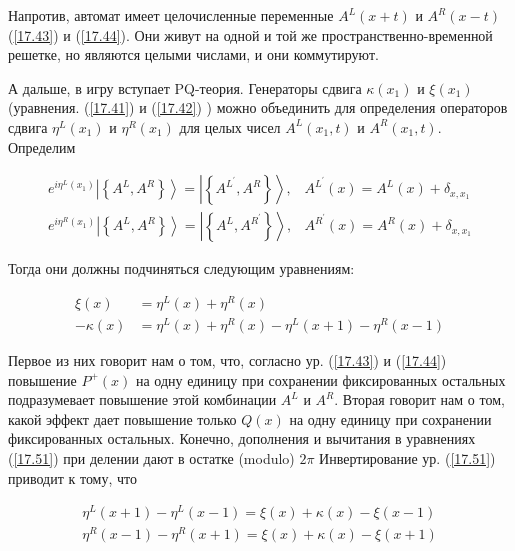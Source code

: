 \documentclass[main.tex]{subfiles}
\begin{document}
Напротив, автомат имеет целочисленные переменные $A^{L}(x+t)$ и $A^{R}(x-t)$ (\ref{17.43}) и (\ref{17.44}). Они живут на одной и той же пространственно-временной решетке, но являются целыми числами, и они коммутируют.

А дальше, в игру вступает PQ-теория. Генераторы сдвига $\kappa(x_{1})$ и $\xi(x_{1})$ (уравнения. (\ref{17.41}) и (\ref{17.42}) ) можно объединить для определения операторов сдвига $\eta^{L}\left(x_{1}\right)$ и $\eta^{R}\left(x_{1}\right)$ для целых чисел $A^{L}\left(x_{1}, t\right)$ и $A^{R}\left(x_{1}, t\right)$. Определим

\begin{equation}\label{17.49}
	\begin{array}{ll}{e^{i \eta^{L}\left(x_{1}\right)}\left|\left\{A^{L}, A^{R}\right\}\right\rangle=\left|\left\{A^{L^{\prime}}, A^{R}\right\}\right\rangle,} & { A^{L^{\prime}}(x)=A^{L}(x)+\delta_{x, x_{1}}} \\ {e^{i \eta^{R}\left(x_{1}\right)}\left|\left\{A^{L}, A^{R}\right\}\right\rangle=\left|\left\{A^{L}, A^{R^{\prime}}\right\}\right\rangle,} & { A^{R^{\prime}}(x)=A^{R}(x)+\delta_{x, x_{1}}}\end{array}
\end{equation}

Тогда они должны подчиняться следующим уравнениям:

\begin{equation}\label{17.51}
	\begin{aligned} \xi(x) &=\eta^{L}(x)+\eta^{R}(x) \\-\kappa(x) &=\eta^{L}(x)+\eta^{R}(x)-\eta^{L}(x+1)-\eta^{R}(x-1) \end{aligned}
\end{equation}

Первое из них говорит нам о том, что, согласно ур. (\ref{17.43}) и (\ref{17.44}) повышение $P^{+}(x)$ на одну единицу при сохранении фиксированных остальных подразумевает повышение этой комбинации $A^{L}$ и $A^{R}$. Вторая говорит нам о том, какой эффект дает повышение только $Q(x)$ на одну единицу при сохранении фиксированных остальных. Конечно, дополнения и вычитания в уравнениях (\ref{17.51}) при делении дают в остатке (modulo) $2 \pi$ Инвертирование ур. (\ref{17.51}) приводит к тому, что

\begin{equation}\label{17.52}
\begin{array}{l}
{\eta^{L}(x+1)-\eta^{L}(x-1)=\xi(x)+\kappa(x)-\xi(x-1)} \\
{\eta^{R}(x-1)-\eta^{R}(x+1)=\xi(x)+\kappa(x)-\xi(x+1)}
\end{array}
\end{equation}
\end{document}
